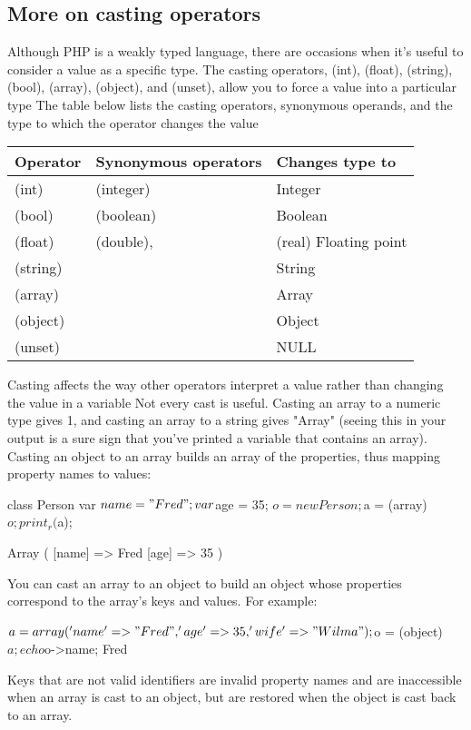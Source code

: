 \documentclass{report}
\begin{document}
\subsection{More on casting operators}
\bigbreak \noindent 
Although PHP is a weakly typed language, there are occasions when it’s useful to consider a value as a specific type. The casting operators, (int), (float), (string), (bool), (array), (object), and (unset), allow you to force a value into a particular type
\bigbreak \noindent 
The table below lists the casting operators, synonymous operands, and the type to which the operator changes the value
\bigbreak \noindent 
\begin{center}
    \begin{tabular}{p{4cm}|p{4cm}|p{4cm}}
        Operator &Synonymous operators &Changes type to \\
        \hline
        (int) &(integer) &Integer \\
        (bool)& (boolean) &Boolean \\
        (float) &(double), &(real) Floating point \\
        (string)&& String \\
        (array)& &Array  \\
        (object) & &Object  \\
        (unset) & &NULL 
    \end{tabular}
\end{center}
\bigbreak \noindent 
Casting affects the way other operators interpret a value rather than changing the value in a variable
\bigbreak \noindent 
Not every cast is useful. Casting an array to a numeric type gives 1, and casting an array to a string gives "Array" (seeing this in your output is a sure sign that you’ve printed a variable that contains an array).
\bigbreak \noindent 
Casting an object to an array builds an array of the properties, thus mapping property names to values:
\bigbreak \noindent 
\begin{phpcode}
    class Person
    {
        var $name = "Fred";
        var $age = 35;
    }
    $o = new Person;
    $a = (array) $o;
    print_r($a);

    Array (
        [name] => Fred
        [age] => 35
    )
\end{phpcode}
\bigbreak \noindent 
You can cast an array to an object to build an object whose properties correspond to
the array’s keys and values. For example:
\bigbreak \noindent 
\begin{phpcode}
    $a = array('name' => "Fred", 'age' => 35, 'wife' => "Wilma");
    $o = (object) $a;
    echo $o->name;
    Fred
\end{phpcode}
\bigbreak \noindent 
Keys that are not valid identifiers are invalid property names and are inaccessible when an array is cast to an object, but are restored when the object is cast back to an array.
\end{document}
